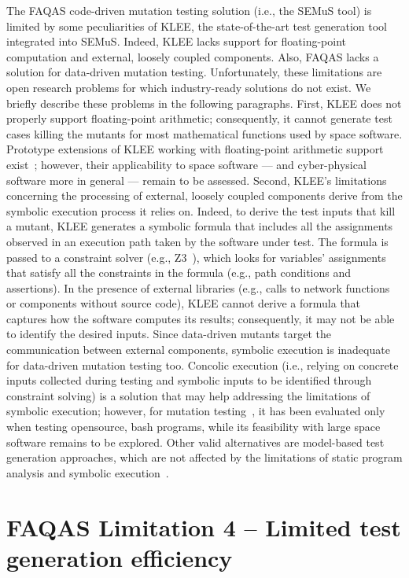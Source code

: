 The FAQAS code-driven mutation testing solution (i.e., the SEMuS tool) is limited by some peculiarities of KLEE, the state-of-the-art test generation tool integrated into SEMuS. Indeed, KLEE lacks support for floating-point computation and external, loosely coupled components. Also, FAQAS lacks a solution for data-driven mutation testing. Unfortunately, these limitations are open research problems for which industry-ready solutions do not exist. We briefly describe these problems in the following paragraphs. First, KLEE does not properly support floating-point arithmetic; consequently, it cannot generate test cases killing the mutants for most mathematical functions used by space software. Prototype extensions of KLEE working with floating-point arithmetic support exist~\cite{Liew,Liew:Fuzz}; however, their applicability to space software — and cyber-physical software more in general — remain to be assessed. Second, KLEE’s limitations concerning the processing of external, loosely coupled components derive from the symbolic execution process it relies on. Indeed, to derive the test inputs that kill a mutant, KLEE generates a symbolic formula that includes all the assignments observed in an execution path taken by the software under test. The formula is passed to a constraint solver (e.g., Z3~\cite{Z3C}), which looks for variables’ assignments that satisfy all the constraints in the formula (e.g., path conditions and assertions). In the presence of external libraries (e.g., calls to network functions or components without source code), KLEE cannot derive a formula that captures how the software computes its results; consequently, it may not be able to identify the desired inputs. Since data-driven mutants target the communication between external components, symbolic execution is inadequate for data-driven mutation testing too. Concolic execution (i.e., relying on concrete inputs collected during testing and symbolic inputs to be identified through constraint solving) is a solution that may help addressing the limitations of symbolic execution; however, for mutation testing~\cite{chekam2021killing}, it has been evaluated only when testing opensource, bash programs, while its feasibility with large space software remains to be explored. Other valid alternatives are model-based test generation approaches, which are not affected by the limitations of static program analysis and symbolic execution~\cite{di2017augmenting}. 

\section*{FAQAS Limitation 4 – Limited test generation efficiency}

